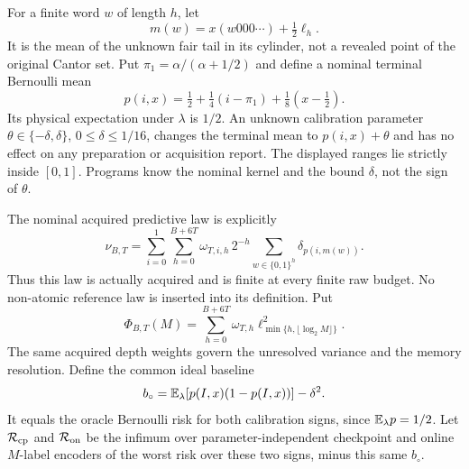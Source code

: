 For a finite word $w$ of length $h$, let
\[
 m(w)=x(w000\cdots)+\tfrac12\ell_h.
\]
It is the mean of the unknown fair tail in its cylinder, not a revealed point of the original Cantor set. Put $\pi_1=\alpha/(\alpha+1/2)$ and define a nominal terminal Bernoulli mean
\begin{equation}\label{eq:ra-score}
 p(i,x)=\tfrac12+\tfrac14(i-\pi_1)+\tfrac18(x-\tfrac12).
\end{equation}
Its physical expectation under $\lambda$ is $1/2$. An unknown calibration parameter $\theta\in\{-\delta,\delta\}$, $0\le\delta\le1/16$, changes the terminal mean to $p(i,x)+\theta$ and has no effect on any preparation or acquisition report. The displayed ranges lie strictly inside $[0,1]$. Programs know the nominal kernel and the bound $\delta$, not the sign of $\theta$.

The nominal acquired predictive law is explicitly
\begin{equation}\label{eq:ra-law}
 \nu_{B,T}=\sum_{i=0}^1\sum_{h=0}^{B+6T}\omega_{T,i,h}\,2^{-h}
        \sum_{w\in\{0,1\}^h}\delta_{p(i,m(w))}.
\end{equation}
Thus this law is actually acquired and is finite at every finite raw budget. No non-atomic reference law is inserted into its definition. Put
\begin{equation}\label{eq:ra-profile}
 \Phi_{B,T}(M)=\sum_{h=0}^{B+6T}\omega_{T,h}
                \ell_{\min\{h,\lfloor\log_2M\rfloor\}}^2.
\end{equation}
The same acquired depth weights govern the unresolved variance and the memory resolution. Define the common ideal baseline
\begin{equation}\label{eq:ra-baseline}
 b_\circ=\mathbb E_\lambda[p(I,x)(1-p(I,x))]-\delta^2.
\end{equation}
It equals the oracle Bernoulli risk for both calibration signs, since $\mathbb E_\lambda p=1/2$. Let $\mathcal R_{\mathrm{cp}}$ and $\mathcal R_{\mathrm{on}}$ be the infimum over parameter-independent checkpoint and online $M$-label encoders of the worst risk over these two signs, minus this same $b_\circ$.

